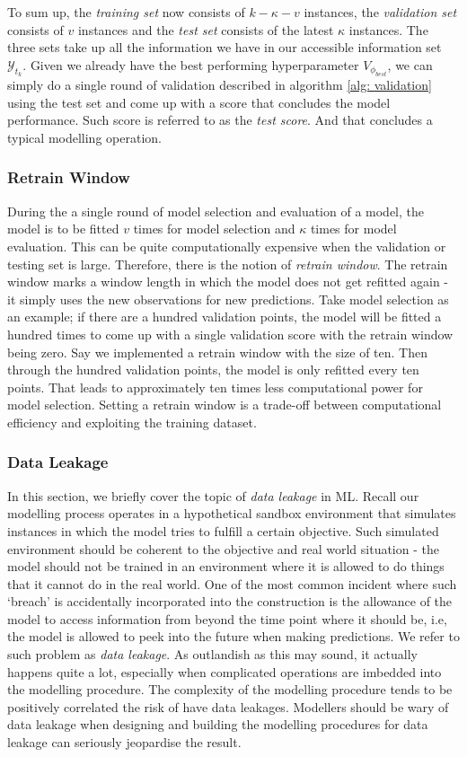To sum up, the \textit{training set} now consists of $k - \kappa - v$ instances, the \textit{validation set} consists of $v$ instances and the \textit{test set} consists of the latest $\kappa$ instances. The three sets take up all the information we have in our accessible information set $\mathcal{Y}_{t_k}$. Given we already have the best performing hyperparameter $V_{\phi_{best}}$, we can simply do a single round of validation described in algorithm \ref{alg: validation} using the test set and come up with a score that concludes the model performance. Such score is referred to as the \textit{test score}. And that concludes a typical modelling operation.

\subsubsection{Retrain Window}
During the a single round of model selection and evaluation of a model, the model is to be fitted $v$ times for model selection and $\kappa$ times for model evaluation. This can be quite computationally expensive when the validation or testing set is large. Therefore, there is the notion of \textit{retrain window}. The retrain window marks a window length in which the model does not get refitted again - it simply uses the new observations for new predictions. Take model selection as an example; if there are a hundred validation points, the model will be fitted a hundred times to come up with a single validation score with the retrain window being zero. Say we implemented a retrain window with the size of ten. Then through the hundred validation points, the model is only refitted every ten points. That leads to approximately ten times less computational power for model selection. Setting a retrain window is a trade-off between computational efficiency and exploiting the training dataset.

\subsubsection{Data Leakage}\label{subsubsec: data leakage}
In this section, we briefly cover the topic of \textit{data leakage} in ML. Recall our modelling process operates in a hypothetical sandbox environment that simulates instances in which the model tries to fulfill a certain objective. Such simulated environment should be coherent to the objective and real world situation - the model should not be trained in an environment where it is allowed to do things that it cannot do in the real world. One of the most common incident where such `breach' is accidentally incorporated into the construction is the allowance of the model to access information from beyond the time point where it should be, i.e, the model is allowed to peek into the future when making predictions. We refer to such problem as \textit{data leakage}. As outlandish as this may sound, it actually happens quite a lot, especially when complicated operations are imbedded into the modelling procedure. The complexity of the modelling procedure tends to be positively correlated the risk of have data leakages. Modellers should be wary of data leakage when designing and building the modelling procedures for data leakage can seriously jeopardise the result.

